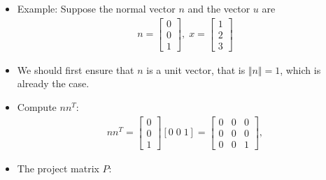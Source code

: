 \begin{frame}{}
    \begin{itemize}
        \item Example:  Suppose the normal vector $n$ and the vector $u$ are 
        \begin{align*}
            n = \begin{bmatrix}
                0\\0\\1
            \end{bmatrix}, \; x = \begin{bmatrix}
                1\\2\\3
            \end{bmatrix}
        \end{align*}
        \item We should first ensure that $n$ is a unit vector, that is $\Vert n \Vert =1$, which is  already the case.
        \item Compute $nn^T$: 
        \begin{align*}
            nn^T = 
                \begin{bmatrix}
                0\\0\\1
            \end{bmatrix}[0\; 0\; 1] = \begin{bmatrix}
                0 &0& 0\\
                0&0& 0\\
                0&0&1
            \end{bmatrix},
        \end{align*}
        \item The project matrix $P$: 
    \end{itemize}
\end{frame}
